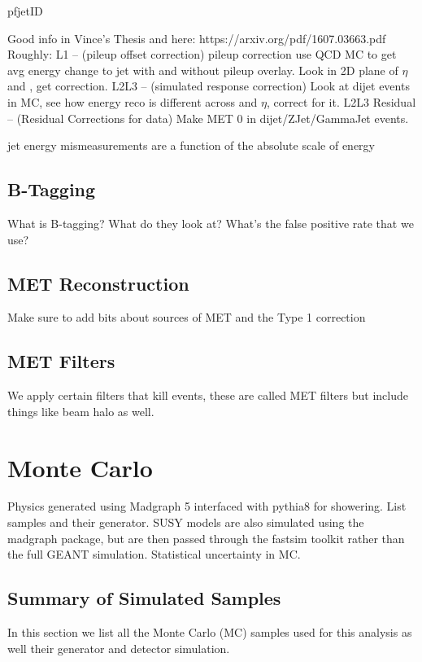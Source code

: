     pfjetID

    Good info in Vince's Thesis and here: https://arxiv.org/pdf/1607.03663.pdf
    Roughly: L1 -- (pileup offset correction) pileup correction use QCD MC to get avg energy change to jet with and without pileup overlay. Look in 2D plane of $\eta$ and \pt, get correction.
    L2L3 -- (simulated response correction) Look at dijet events in MC, see how energy reco is different across \pt and $\eta$, correct for it.
    L2L3 Residual -- (Residual Corrections for data) Make MET 0 in dijet/ZJet/GammaJet events.

    jet energy mismeasurements are a function of the absolute scale of energy

  \subsection{B-Tagging} \label{sec:b-tagging}
    What is B-tagging? What do they look at? What's the false positive rate that we use?

  \subsection{MET Reconstruction} \label{sec:MET_reco}
    Make sure to add bits about sources of MET and the Type 1 correction
  \subsection{MET Filters} \label{sec:met_filters} 
    We apply certain filters that kill events, these are called MET filters but include things like beam halo as well.

\section{Monte Carlo} \label{sec:monte_carlo}
  Physics generated using Madgraph 5 interfaced with pythia8 for showering. List samples and their generator.
  SUSY models are also simulated using the madgraph package, but are then passed through the fastsim toolkit \cite{fastsim} rather than the full GEANT simulation. Statistical uncertainty in MC.
  \subsection{Summary of Simulated Samples} \label{sec:summary_of_simulated_samples}
    
    In this section we list all the Monte Carlo (MC) samples used for this analysis as well their generator and detector simulation.

